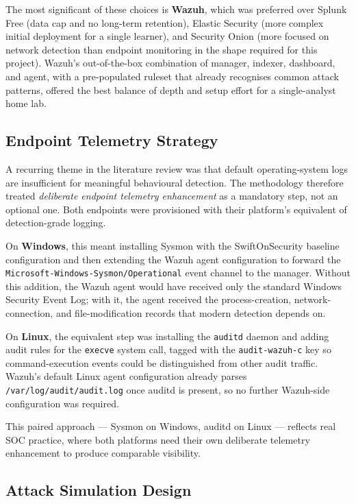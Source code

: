 The most significant of these choices is \textbf{Wazuh}, which was preferred
over Splunk Free (data cap and no long-term retention), Elastic Security
(more complex initial deployment for a single learner), and Security Onion
(more focused on network detection than endpoint monitoring in the shape
required for this project). Wazuh's out-of-the-box combination of manager,
indexer, dashboard, and agent, with a pre-populated ruleset that already
recognises common attack patterns, offered the best balance of depth and
setup effort for a single-analyst home lab.

\subsection{Endpoint Telemetry Strategy}
\label{sec:telemetry-strategy}

A recurring theme in the literature review was that default operating-system
logs are insufficient for meaningful behavioural detection. The methodology
therefore treated \textit{deliberate endpoint telemetry enhancement} as a
mandatory step, not an optional one. Both endpoints were provisioned with
their platform's equivalent of detection-grade logging.

On \textbf{Windows}, this meant installing Sysmon with the SwiftOnSecurity
baseline configuration and then extending the Wazuh agent configuration to
forward the \texttt{Microsoft-Windows-Sysmon/Operational} event channel to the
manager. Without this addition, the Wazuh agent would have received only
the standard Windows Security Event Log; with it, the agent received the
process-creation, network-connection, and file-modification records that
modern detection depends on.

On \textbf{Linux}, the equivalent step was installing the \texttt{auditd}
daemon and adding audit rules for the \texttt{execve} system call, tagged with
the \texttt{audit-wazuh-c} key so command-execution events could be
distinguished from other audit traffic. Wazuh's default Linux agent
configuration already parses \texttt{/var/log/audit/audit.log} once auditd is
present, so no further Wazuh-side configuration was required.

This paired approach --- Sysmon on Windows, auditd on Linux --- reflects real
SOC practice, where both platforms need their own deliberate telemetry
enhancement to produce comparable visibility.

\subsection{Attack Simulation Design}
\label{sec:sim-design}

